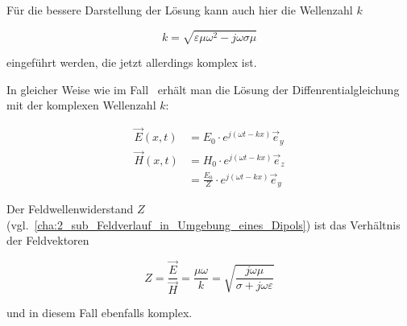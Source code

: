 Für die bessere Darstellung der Lösung kann auch hier die Wellenzahl $k$ 

\begin{equation}
    k = \sqrt{\varepsilon \mu \omega^2 - j \omega \sigma \mu}
\end{equation}

eingeführt werden, die jetzt allerdings komplex ist. \par
In gleicher Weise wie im Fall~ erhält man die Lösung der Diffenrentialgleichung~\cite{Methoden_physikalischer_Mathematik_Band_2} mit der komplexen Wellenzahl $k$:

\begin{subequations}
    \begin{align}
        \vec E(x,t) &= E_0 \cdot e^{j (\omega t - k x)} \vec e_y \\
        \vec H(x,t) &= H_0 \cdot e^{j (\omega t - k x)} \vec e_z \nonumber \\
                    &= \frac{E_0}{Z} \cdot e^{j (\omega t - k x)} \vec e_y
    \end{align}
    \label{eq:A_Wellengleichungen_mit_Leitfaehigkeit}
\end{subequations}

Der Feldwellenwiderstand $Z$ (vgl.~\Abschnitt \ref{cha:2_sub_Feldverlauf_in_Umgebung_eines_Dipols}) ist das Verhältnis der Feldvektoren

\begin{equation}
    Z = \frac{\vec E}{\vec H} = \frac{\mu \omega}{k} = \sqrt{\frac{j \omega \mu}{\sigma + j \omega \varepsilon}}
\end{equation}

und in diesem Fall ebenfalls komplex.




